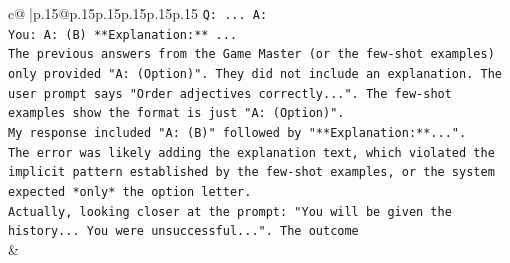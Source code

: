 \documentclass{article}
\begin{document}
{\begin{supertabular}{c@{$\;$}|p{.15\linewidth}@{}p{.15\linewidth}p{.15\linewidth}p{.15\linewidth}p{.15\linewidth}p{.15\linewidth}}
{{{\texttt{Q: ... A:} \\
\texttt{You: A: (B) **Explanation:** ...} \\
\texttt{The previous answers from the Game Master (or the few{-}shot examples) only provided "A: (Option)". They did not include an explanation. The user prompt says "Order adjectives correctly...". The few{-}shot examples show the format is just "A: (Option)".} \\
\texttt{My response included "A: (B)" followed by "**Explanation:**...".} \\
\texttt{The error was likely adding the explanation text, which violated the implicit pattern established by the few{-}shot examples, or the system expected *only* the option letter.} \\
\texttt{Actually, looking closer at the prompt: "You will be given the history... You were unsuccessful...". The outcome} \\
            }
        }
    }
    & \\ \\

\end{supertabular}
}
\end{document}
